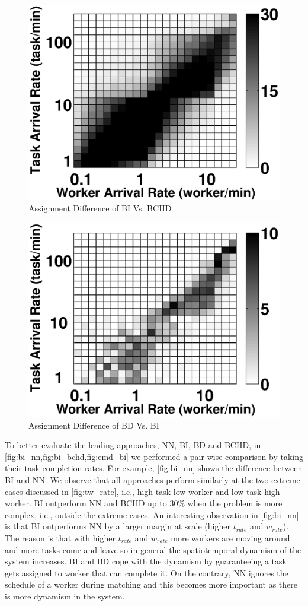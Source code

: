 \begin{figure}[h]
	\centering
	\includegraphics[width = 0.65\columnwidth]{figures/bi_bchd.eps}
	\vspace{-0.1in}
	\caption{Assignment Difference of BI Vs. BCHD}\label{fig:bi_bchd}
\end{figure}

\begin{figure}[h]
	\centering
	\includegraphics[width = 0.65\columnwidth]{figures/emd_bi.eps}
	\vspace{-0.1in}
	\caption{Assignment Difference of BD Vs. BI}\label{fig:emd_bi}
\end{figure}

To better evaluate the leading approaches, NN, BI, BD and BCHD, in \cref{fig:bi_nn,fig:bi_bchd,fig:emd_bi} we performed a pair-wise comparison by taking their task completion rates. For example, \cref{fig:bi_nn} shows the difference between BI and NN. We observe that all approaches perform similarly at the two extreme cases discussed in \cref{fig:tw_rate}, i.e., high task-low worker and low task-high worker. BI outperform NN and BCHD up to 30\% when the problem is more complex, i.e., outside the extreme cases. An interesting observation in \cref{fig:bi_nn} is that BI outperforms NN by a larger margin at scale (higher $t_{rate}$ and $w_{rate}$). The reason is that with higher $t_{rate}$ and $w_{rate}$ more workers are moving around and more tasks come and leave so in general the spatiotemporal dynamism of the system increases. BI and BD cope with the dynamism by guaranteeing a task gets assigned to worker that can complete it. On the contrary, NN ignores the schedule of a worker during matching and this becomes more important as there is more dynamism in the system.\\

